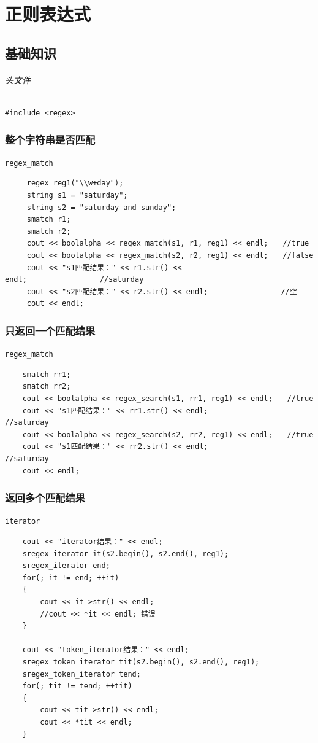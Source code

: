 \documentclass[UTF8,a4paper,12pt]{ctexbook}
\begin{document}
	

\chapter{正则表达式}
	\section{基础知识}
		\subparagraph{头文件} \verb|#include <regex>|
		
		\subsection{整个字符串是否匹配} \verb|regex_match|
			\begin{lstlisting}
	 regex reg1("\\w+day");
	 string s1 = "saturday";
	 string s2 = "saturday and sunday";
	 smatch r1;
	 smatch r2;
	 cout << boolalpha << regex_match(s1, r1, reg1) << endl;　　//true
	 cout << boolalpha << regex_match(s2, r2, reg1) << endl;　　//false
	 cout << "s1匹配结果：" << r1.str() << endl;　　　　　　　　　　//saturday
	 cout << "s2匹配结果：" << r2.str() << endl;　　　　　　　　　　//空
	 cout << endl;
			\end{lstlisting}
		\subsection{只返回一个匹配结果} \verb|regex_match|
			\begin{lstlisting}
	smatch rr1;
	smatch rr2;
	cout << boolalpha << regex_search(s1, rr1, reg1) << endl;　　//true
	cout << "s1匹配结果：" << rr1.str() << endl; 　　　　　　　　　　//saturday
	cout << boolalpha << regex_search(s2, rr2, reg1) << endl;　　//true
	cout << "s1匹配结果：" << rr2.str() << endl;　　　　　　　　　　 //saturday
	cout << endl;
			\end{lstlisting}
		
		\subsection{返回多个匹配结果} \verb|iterator|
			\begin{lstlisting}
	cout << "iterator结果：" << endl;
	sregex_iterator it(s2.begin(), s2.end(), reg1);
	sregex_iterator end;
	for(; it != end; ++it)
	{
		cout << it->str() << endl;
		//cout << *it << endl; 错误
	}
	
	cout << "token_iterator结果：" << endl;
	sregex_token_iterator tit(s2.begin(), s2.end(), reg1);
	sregex_token_iterator tend;
	for(; tit != tend; ++tit)
	{
		cout << tit->str() << endl;
		cout << *tit << endl;
	}
			\end{lstlisting}
			
\end{document}
